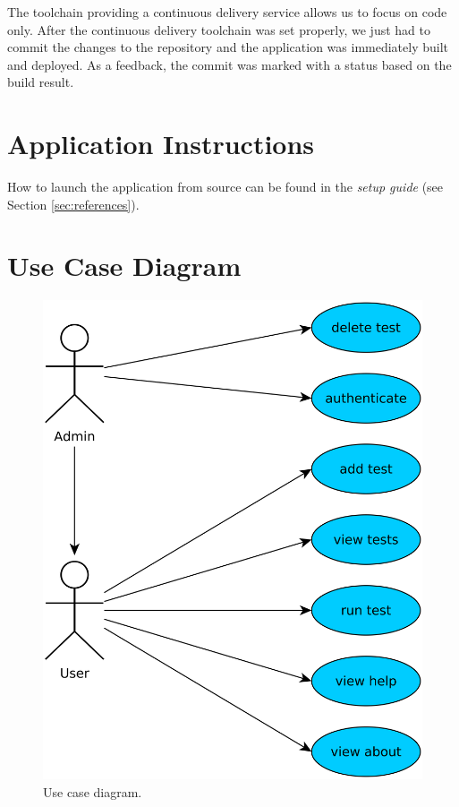 \documentclass[11pt,a4paper]{article}
\begin{document}
The toolchain providing a continuous delivery service allows us to focus on code only. After the continuous delivery toolchain was set properly, we just had to commit the changes to the repository and the application was immediately built and deployed. As a feedback, the commit was marked with a status based on the build result.

\section{Application Instructions}

How to launch the application from source can be found in the \textit{setup guide} (see Section \ref{sec:references}).

\section{Use Case Diagram}

\begin{figure}[H]
    \centering
    \includegraphics[scale=0.07]{diag/use_case.pdf}
    \caption{Use case diagram.}
    \label{fig:usecase}
\end{figure}
\end{document}
